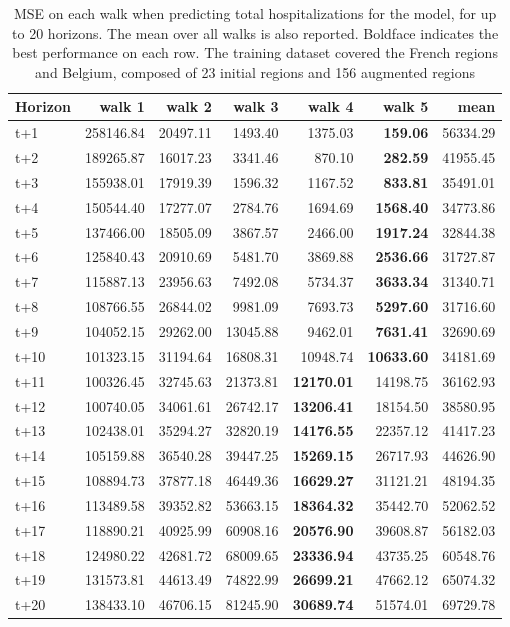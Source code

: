 \begin{table}[H]
\centering
\caption{MSE on each walk when predicting total hospitalizations for the model, for up to 20 horizons. The mean over all walks is also reported. Boldface indicates the best performance on each row. The training dataset covered the French regions and Belgium, composed of 23 initial regions and 156 augmented regions }
\label{tab:MSE_walk_encoder_decoder}
\begin{tabular}{lrrrrrr}
\toprule
Horizon &    walk 1 &   walk 2 &   walk 3 &   walk 4 &   walk 5 &     mean \\
\midrule
t+1  & 258146.84  & 20497.11  & 1493.40  & 1375.03  & \textbf{159.06}  & 56334.29  \\
t+2  & 189265.87  & 16017.23  & 3341.46  & 870.10  & \textbf{282.59}  & 41955.45  \\
t+3  & 155938.01  & 17919.39  & 1596.32  & 1167.52  & \textbf{833.81}  & 35491.01  \\
t+4  & 150544.40  & 17277.07  & 2784.76  & 1694.69  & \textbf{1568.40}  & 34773.86  \\
t+5  & 137466.00  & 18505.09  & 3867.57  & 2466.00  & \textbf{1917.24}  & 32844.38  \\
t+6  & 125840.43  & 20910.69  & 5481.70  & 3869.88  & \textbf{2536.66}  & 31727.87  \\
t+7  & 115887.13  & 23956.63  & 7492.08  & 5734.37  & \textbf{3633.34}  & 31340.71  \\
t+8  & 108766.55  & 26844.02  & 9981.09  & 7693.73  & \textbf{5297.60}  & 31716.60  \\
t+9  & 104052.15  & 29262.00  & 13045.88  & 9462.01  & \textbf{7631.41}  & 32690.69  \\
t+10  & 101323.15  & 31194.64  & 16808.31  & 10948.74  & \textbf{10633.60}  & 34181.69  \\
t+11  & 100326.45  & 32745.63  & 21373.81  & \textbf{12170.01}  & 14198.75  & 36162.93  \\
t+12  & 100740.05  & 34061.61  & 26742.17  & \textbf{13206.41}  & 18154.50  & 38580.95  \\
t+13  & 102438.01  & 35294.27  & 32820.19  & \textbf{14176.55}  & 22357.12  & 41417.23  \\
t+14  & 105159.88  & 36540.28  & 39447.25  & \textbf{15269.15}  & 26717.93  & 44626.90  \\
t+15  & 108894.73  & 37877.18  & 46449.36  & \textbf{16629.27}  & 31121.21  & 48194.35  \\
t+16  & 113489.58  & 39352.82  & 53663.15  & \textbf{18364.32}  & 35442.70  & 52062.52  \\
t+17  & 118890.21  & 40925.99  & 60908.16  & \textbf{20576.90}  & 39608.87  & 56182.03  \\
t+18  & 124980.22  & 42681.72  & 68009.65  & \textbf{23336.94}  & 43735.25  & 60548.76  \\
t+19  & 131573.81  & 44613.49  & 74822.99  & \textbf{26699.21}  & 47662.12  & 65074.32  \\
t+20  & 138433.10  & 46706.15  & 81245.90  & \textbf{30689.74}  & 51574.01  & 69729.78  \\

\bottomrule
\end{tabular}
\end{table}
